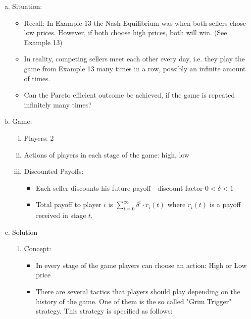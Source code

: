 \begin{enumerate}[a)]
    \item Situation:
        \begin{itemize}
            \item Recall: In Example 13 the Nash Equilibrium was when both
                sellers chose low prices. However, if both choose high prices,
                both will win. (See Example 13)
            \item In reality, competing sellers meet each other every day, i.e.
                they play the game from Example 13 many times in a row, possibly
                an infinite amount of times.
            \item Can the Pareto efficient outcome be achieved, if the game
                is repeated infinitely many times?
        \end{itemize}
    \item Game:
        \begin{enumerate}[(i)]
            \item Players: 2
            \item Actions of players in each stage of the game: high, low
            \item Discounted Payoffs:
                \begin{itemize}
                    \item Each seller discounts his future payoff - discount factor $0 < \delta < 1$
                    \item Total payoff to player $i$ is $\sum_{t=0}^\infty \delta^t \cdot r_i(t)$
                        where $r_i(t)$ is a payoff received in stage $t$.
                \end{itemize}
        \end{enumerate}
    \item Solution
        \begin{enumerate}[c1)]
            \item Concept:
                \begin{itemize}
                    \item In every stage of the game players can choose an
                        action: High or Low price
                    \item There are several tactics that players should play
                        depending on the history of the game. One of them is the
                        so called "Grim Trigger" strategy. This strategy is
                        specified as follows:

\end{itemize}
\end{enumerate}
\end{enumerate}
